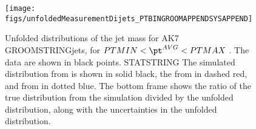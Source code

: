 \begin{figure}[htbp]
\centering
\texttt{[image: figs/unfoldedMeasurementDijets\_PTBINGROOMAPPENDSYSAPPEND]}
\caption{Unfolded distributions of the jet mass for AK7 GROOMSTRINGjets,
for $PTMIN < \pt^{AVG} < PTMAX$ \GeVc. The data are shown in black
points. 
STATSTRING
The simulated distribution from \PYTHIA is shown in solid black, 
the from \PYTHIAEIGHT in dashed red, and from \HERWIG in dotted blue. 
The bottom frame shows the ratio of the true distribution from
the simulation divided by the unfolded distribution, along with
the uncertainties in the unfolded distribution. 
\label{figs:unfoldedMeasurementDijets_PTBINGROOMAPPENDSYSAPPEND}}
\end{figure}

